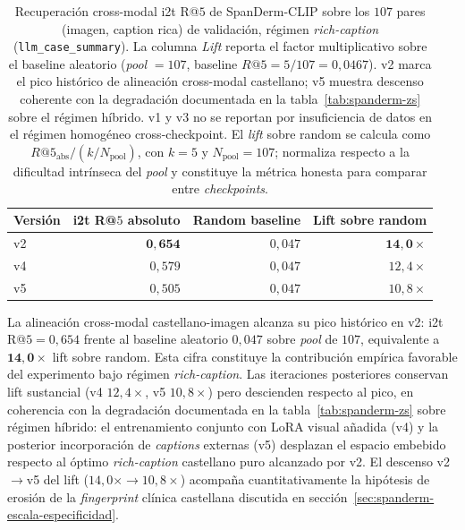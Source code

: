 \begin{table}[H]
\centering
\footnotesize
\setlength{\tabcolsep}{4pt}
\renewcommand{\arraystretch}{0.95}
\caption{Recuperación cross-modal i2t R@$5$ de SpanDerm-CLIP sobre
los $107$ pares (imagen, caption rica) de validación, régimen
\emph{rich-caption} (\texttt{llm\_case\_summary}). La columna
\emph{Lift} reporta el factor multiplicativo sobre el baseline
aleatorio (\emph{pool} $= 107$, baseline $R@5 = 5/107 = 0{,}0467$).
v2 marca el pico histórico de alineación cross-modal castellano;
v5 muestra descenso coherente con la degradación documentada en
la tabla~\ref{tab:spanderm-zs} sobre el régimen híbrido. v1 y v3
no se reportan por insuficiencia de datos en el régimen
homogéneo cross-checkpoint. El \emph{lift} sobre random se
calcula como $R@5_{\mathrm{abs}} / (k / N_{\mathrm{pool}})$, con
$k = 5$ y $N_{\mathrm{pool}} = 107$; normaliza respecto a la
dificultad intrínseca del \emph{pool} y constituye la métrica
honesta para comparar entre \emph{checkpoints}.}
\label{tab:spanderm-retrieval}
\begin{tabular}{lrrr}
\hline
Versión & i2t R@$5$ absoluto  & Random baseline & Lift sobre random        \\
\hline
v2      & $\mathbf{0{,}654}$  & $0{,}047$       & $\mathbf{14{,}0\times}$  \\
v4      & $0{,}579$           & $0{,}047$       & $12{,}4\times$           \\
v5      & $0{,}505$           & $0{,}047$       & $10{,}8\times$           \\
\hline
\end{tabular}
\end{table}

La alineación cross-modal castellano-imagen alcanza su pico
histórico en v2: i2t R@$5 = 0{,}654$ frente al baseline aleatorio
$0{,}047$ sobre \emph{pool} de $107$, equivalente a
$\mathbf{14{,}0\times}$ lift sobre random. Esta cifra constituye
la contribución empírica favorable del experimento bajo régimen
\emph{rich-caption}. Las iteraciones posteriores conservan lift
sustancial (v4 $12{,}4\times$, v5 $10{,}8\times$) pero descienden
respecto al pico, en coherencia con la degradación documentada en
la tabla~\ref{tab:spanderm-zs} sobre régimen híbrido: el
entrenamiento conjunto con LoRA visual añadida (v4) y la posterior
incorporación de \emph{captions} externas (v5) desplazan el
espacio embebido respecto al óptimo \emph{rich-caption} castellano
puro alcanzado por v2. El descenso v2$\to$v5 del lift
($14{,}0\times \to 10{,}8\times$) acompaña cuantitativamente la
hipótesis de erosión de la \emph{fingerprint} clínica castellana
discutida en
secci\'on~\ref{sec:spanderm-escala-especificidad}.


